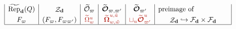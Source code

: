 \documentclass[border={7pt 0pt 200pt 0pt},varwidth]{standalone}
\DeclareMathOperator{\RRep}{\widetilde{\operatorname{Rep}}}
\DeclareMathOperator{\St}{\mathcal{Z}}
\newcommand{\dimvec}[1]{\mathbf{#1}}
\newcommand{\ww}{\varpi}
\newcommand{\Omcell}{\Omega}
\newcommand{\OOmcell}{\boldsymbol{\Omega}}
\newcommand{\Ocell}{\mathcal{O}}
\newcommand{\OOcell}{\boldsymbol{\mathcal{O}}}
\newcommand{\preimage}[1]{\widetilde{#1}}
\begin{document}
\begin{table}[ht]
\[\begin{array}{|c|c|c|c|c|c|}
  \RRep_{\dimvec{d}}(Q) & \St_{\dimvec{d}} & \preimage{\Ocell}_{\ww} & \preimage{\OOcell}_{\ww,\ww'} & \preimage{\OOcell}_{\ww'} &\text{preimage of \hspace{1.6cm}}\\
  F_{\ww} & (F_{\ww},F_{\ww\ww'}) &\textcolor{BrickRed}{\preimage{\Omcell}_{w}^{u}} & \textcolor{BrickRed}{\preimage{\OOmcell}_{w,\tilde{w}}^{u,\tilde{u}}} & \textcolor{BrickRed}{\sqcup_{u}\preimage{\OOcell}_{\ww'}^{u}} &\St_{\dimvec{d}} \hookrightarrow \mathcal{F}_{\dimvec{d}} \times \mathcal{F}_{\dimvec{d}}\\\hline 
 \end{array}
 \]
        
\end{table}
\end{document}
